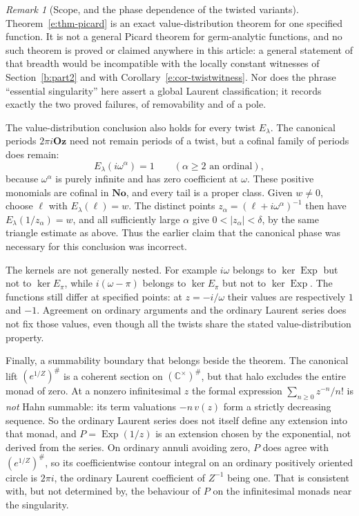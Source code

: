 \documentclass[11pt,a4paper]{article}
\numberwithin{equation}{section}
\theoremstyle{definition}
\theoremstyle{remark}
\newtheorem{remark}[theorem]{Remark}
\theoremstyle{plain}
\newcommand{\No}{\mathbf{No}}
\newcommand{\Oz}{\mathbf{Oz}}
\newcommand{\CC}{\mathbb C}
\DeclareMathOperator{\Exp}{Exp}
\newcommand{\halo}[1]{#1^{\#}}
\newcommand{\ev}[1]{#1^{\#}}
\newcommand{\abs}[1]{\lvert #1\rvert}
\begin{document}
\begin{remark}[Scope, and the phase dependence of the twisted variants]
\label{e:rem-picardscope}
Theorem~\ref{e:thm-picard} is an exact value-distribution theorem for one
specified function.  It is not a general Picard theorem for germ-analytic
functions, and no such theorem is proved or claimed anywhere in this
article: a general statement of that breadth would be incompatible with
the locally constant witnesses of Section~\ref{b:part2} and with
Corollary~\ref{e:cor-twistwitness}.  Nor does the phrase ``essential
singularity'' here assert a global Laurent classification; it records
exactly the two proved failures, of removability and of a pole.

The value-distribution conclusion also holds for every twist
$E_\lambda$. The canonical periods $2\pi i\Oz$ need not remain
periods of a twist, but a cofinal family of periods does remain:
\[
 E_\lambda(i\omega^\alpha)=1\qquad(\alpha\ge2\text{ an ordinal}),
\]
because $\omega^\alpha$ is purely infinite and has zero coefficient at
$\omega$. These positive monomials are cofinal in $\No$, and every tail
is a proper class. Given $w\ne0$, choose $\ell$ with $E_\lambda(\ell)=w$.
The distinct points $z_\alpha=(\ell+i\omega^\alpha)^{-1}$ then have
$E_\lambda(1/z_\alpha)=w$, and all sufficiently large $\alpha$ give
$0<\abs{z_\alpha}<\delta$, by the same triangle estimate as above.
Thus the earlier claim that the canonical phase was necessary for this
conclusion was incorrect.

The kernels are not generally nested. For example $i\omega$ belongs to
$\ker\Exp$ but not to $\ker E_\pi$, while $i(\omega-\pi)$ belongs to
$\ker E_\pi$ but not to $\ker\Exp$. The functions still differ at
specified points: at $z=-i/\omega$ their values are respectively $1$ and
$-1$. Agreement on ordinary arguments and the ordinary Laurent series
does not fix those values, even though all the twists share the stated
value-distribution property.

Finally, a summability boundary that belongs beside the theorem.  The
canonical lift $\ev{(e^{1/Z})}$ is a coherent section on
$\halo{(\CC^{\times})}$, but that halo excludes the entire monad of zero.
At a nonzero infinitesimal $z$ the formal expression
$\sum_{n\ge0}z^{-n}/n!$ is \emph{not} Hahn summable: its term valuations
$-n\,v(z)$ form a strictly decreasing sequence.  So the ordinary Laurent
series does not itself define any extension into that monad, and
$P=\Exp(1/z)$ is an extension chosen by the exponential, not derived from
the series.  On ordinary annuli avoiding zero, $P$ does agree with
$\ev{(e^{1/Z})}$, so its coefficientwise contour integral on an ordinary
positively oriented circle is $2\pi i$, the ordinary Laurent coefficient of
$Z^{-1}$ being one.  That is consistent with, but not determined by, the
behaviour of $P$ on the infinitesimal monads near the singularity.
\end{remark}
\end{document}
